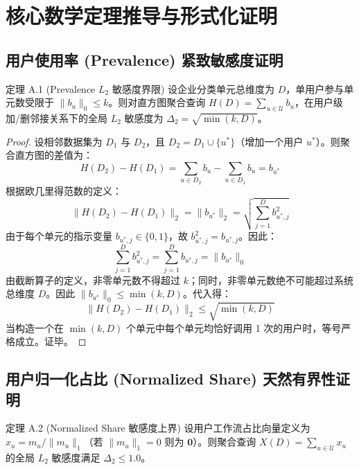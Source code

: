 \section{核心数学定理推导与形式化证明}
\label{app:math}

\subsection{用户使用率 (Prevalence) 紧致敏感度证明}
\begin{techbox}{定理 A.1 (Prevalence $L_2$ 敏感度界限)}
设企业分类单元总维度为 $D$，单用户参与单元数受限于 $\|b_u\|_0 \le k$。则对直方图聚合查询 $H(D) = \sum_{u \in \mathcal{U}} b_u$，在用户级加/删邻接关系下的全局 $L_2$ 敏感度为 $\Delta_2 = \sqrt{\min(k, D)}$。
\end{techbox}

\begin{proof}
设相邻数据集为 $D_1$ 与 $D_2$，且 $D_2 = D_1 \cup \{u^*\}$（增加一个用户 $u^*$）。则聚合直方图的差值为：
\begin{equation}
  H(D_2) - H(D_1) = \sum_{u \in D_2} b_u - \sum_{u \in D_1} b_u = b_{u^*}
\end{equation}
根据欧几里得范数的定义：
\begin{equation}
  \|H(D_2) - H(D_1)\|_2 = \|b_{u^*}\|_2 = \sqrt{\sum_{j=1}^D b_{u^*, j}^2}
\end{equation}
由于每个单元的指示变量 $b_{u^*, j} \in \{0, 1\}$，故 $b_{u^*, j}^2 = b_{u^*, j}$。因此：
\begin{equation}
  \sum_{j=1}^D b_{u^*, j}^2 = \sum_{j=1}^D b_{u^*, j} = \|b_{u^*}\|_0
\end{equation}
由截断算子的定义，非零单元数不得超过 $k$；同时，非零单元数绝不可能超过系统总维度 $D$。因此 $\|b_{u^*}\|_0 \le \min(k, D)$。代入得：
\begin{equation}
  \|H(D_2) - H(D_1)\|_2 \le \sqrt{\min(k, D)}
\end{equation}
当构造一个在 $\min(k, D)$ 个单元中每个单元均恰好调用 1 次的用户时，等号严格成立。证毕。
\end{proof}

\subsection{用户归一化占比 (Normalized Share) 天然有界性证明}
\begin{techbox}{定理 A.2 (Normalized Share 敏感度上界)}
设用户工作流占比向量定义为 $x_u = m_u / \|m_u\|_1$（若 $\|m_u\|_1 = 0$ 则为 $\mathbf{0}$）。则聚合查询 $X(D) = \sum_{u \in \mathcal{U}} x_u$ 的全局 $L_2$ 敏感度满足 $\Delta_2 \le 1.0$。
\end{techbox}

